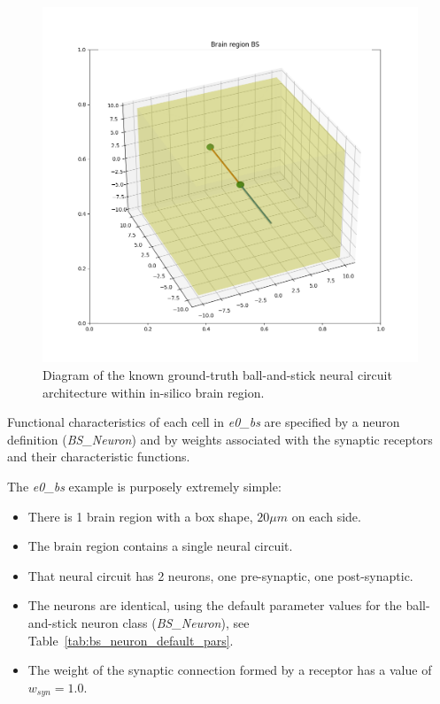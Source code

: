 \documentclass{ldr-article}
\def\firstexp{\textit{e0\_bs} }
\begin{document}
\begin{figure}
	\centering
	\includegraphics[width=1\linewidth]{figures/e0_bs.png}
	\caption{Diagram of the known ground-truth ball-and-stick neural circuit architecture within in-silico brain region.
	}
	\label{fig:KGT-architecture}
\end{figure}

Functional characteristics of each cell in \firstexp are specified by a neuron definition (\textit{BS\_Neuron}) and by weights associated with the synaptic receptors and their characteristic functions.

The \firstexp example is purposely extremely simple:
\begin{itemize}
	\item There is 1 brain region with a box shape, $20 \mu m$ on each side.
	\item The brain region contains a single neural circuit.
	\item That neural circuit has 2 neurons, one pre-synaptic, one post-synaptic.
	\item The neurons are identical, using the default parameter values for the ball-and-stick neuron class (\textit{BS\_Neuron}), see Table~\ref{tab:bs_neuron_default_pars}.
	\item The weight of the synaptic connection formed by a receptor has a value of $w_{syn} = 1.0$.
\end{itemize}
\end{document}
